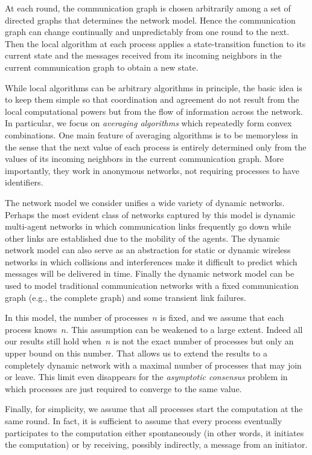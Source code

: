 \documentclass[a4paper]{article}
\theoremstyle{newthm}
\begin{document}
At each round, the communication graph is chosen arbitrarily among a  set
	of directed graphs that determines the network model.
Hence the communication graph can change continually and unpredictably from one
	round to the next.
Then the local algorithm at each process applies a state-transition function to its current state 
	and the messages received from its incoming neighbors
	in the current communication graph to obtain a new state. 

While local algorithms can be arbitrary algorithms in principle, the basic idea is to keep them simple
	so that coordination and agreement do not result from the local computational powers
	but from the flow of information across the network.
In particular, we focus on {\em averaging algorithms} which  repeatedly form convex combinations.
One main feature of averaging algorithms is to be memoryless in the sense that 
	the next value of each process is entirely determined only from the values
	of its incoming neighbors in the current communication graph.
More importantly, they work in anonymous networks, not requiring processes to have identifiers.


The  network model we consider unifies a wide variety of dynamic networks. 
Perhaps the most evident class of networks captured by this model is dynamic multi-agent networks
	in which communication links frequently go down while other links are established
	due to the mobility of the agents.
The dynamic network model can also serve as an abstraction for static or dynamic wireless
	networks in which collisions and interferences make it difficult to predict which messages 
	will be delivered in time.
Finally the dynamic network model  can be used to model traditional communication networks
	with a fixed communication graph (e.g., the complete graph) and some transient link failures.
	
In this model, the number of processes~$n$ is fixed, and we assume that each process
	knows~$n$.
This assumption can be weakened to a large extent.
Indeed all our results still hold when~$n$ is not the exact number of processes
	but only an upper bound on this number.
That allows us to extend the results to a completely dynamic network
	with  a maximal number of processes  that may join or
	leave.
This limit even disappears for the {\em asymptotic consensus} problem
	in which  processes are just required to converge to the same value.
	
Finally, for simplicity, we  assume that all processes start the computation at the same 
	round. 
In fact, it is sufficient to assume that every process eventually participates to the
	computation either spontaneously (in other words,  it initiates the computation)
	or by receiving, possibly indirectly, a message from an initiator.
\end{document}
